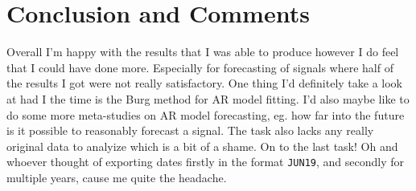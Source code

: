 \documentclass[10pt, titlepage, a4paper]{article}
\begin{document}
\section{Conclusion and Comments}
Overall I'm happy with the results that I was able to produce however I do feel that I could have done more. Especially 
for forecasting of signals where half of the results I got were not really satisfactory. One thing I'd definitely take a look 
at had I the time is the Burg method for AR model fitting. I'd also maybe like to do some more meta-studies on AR model forecasting, eg.
how far into the future is it possible to reasonably forecast a signal. The task also lacks any really original data to 
analyize which is a bit of a shame. On to the last task! Oh and whoever thought of exporting dates firstly in the format
\texttt{JUN19}, and secondly for multiple years, cause me quite the headache.

\newpage



\end{document}

